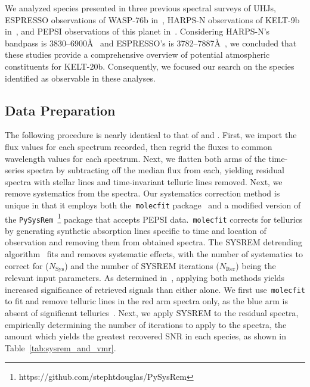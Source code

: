 \documentclass[twocolumn]{aastex631}
\newcommand{\code}[1]{\texttt{#1}}
\begin{document}
            We analyzed species presented in three previous spectral surveys of UHJs, ESPRESSO observations of WASP-76b in~\citet{Kesseli2022}, HARPS-N observations of KELT-9b in~\citet{Hoeijmakers2019}, and PEPSI observations of this planet in~\citet{Petz2023}. Considering HARPS-N's bandpass is 3830--6900\AA~\citep{Cosentino2012} and ESPRESSO's is 3782--7887\AA~\citep{Pepe2021}, we concluded that these studies provide a comprehensive overview of potential atmospheric constituents for KELT-20b. Consequently, we focused our search on the species identified as observable in these analyses.
            
        \subsection{Data Preparation}\label{subsec:Data Preparation}
            The following procedure is nearly identical to that of \citet{Johnson2023} and \citet{Petz2023}. First, we import the flux values for each spectrum recorded, then regrid the fluxes to common wavelength values for each spectrum. Next, we flatten both arms of the time-series spectra by subtracting off the median flux from each, yielding residual spectra with stellar lines and time-invariant telluric lines removed. Next, we remove systematics from the spectra. Our systematics correction method is unique in that it employs both the~\code{molecfit} package~\citep{Smette2015, Kausch2015} and a modified version of the \code{PySysRem}~\footnote{https://github.com/stephtdouglas/PySysRem} package that accepts PEPSI data.~\code{molecfit} corrects for tellurics by generating synthetic absorption lines specific to time and location of observation and removing them from obtained spectra. The SYSREM detrending algorithm~\citep{Tamuz2005} fits and removes systematic effects, with the number of systematics to correct for ($N_{\mathrm{Sys}}$) and the number of SYSREM iterations ($N_{\mathrm{Iter}}$) being the relevant input parameters. As determined in~\citet{Johnson2023}, applying both methods yields increased significance of retrieved signals than either alone. We first use~\code{molecfit} to fit and remove telluric lines in the red arm spectra only, as the blue arm is absent of significant tellurics~\citep{Smette2015}. Next, we apply SYSREM to the residual spectra, empirically determining the number of iterations to apply to the spectra, the amount which yields the greatest recovered SNR in each species, as shown in Table~\ref{tab:sysrem_and_vmr}.
\end{document}
